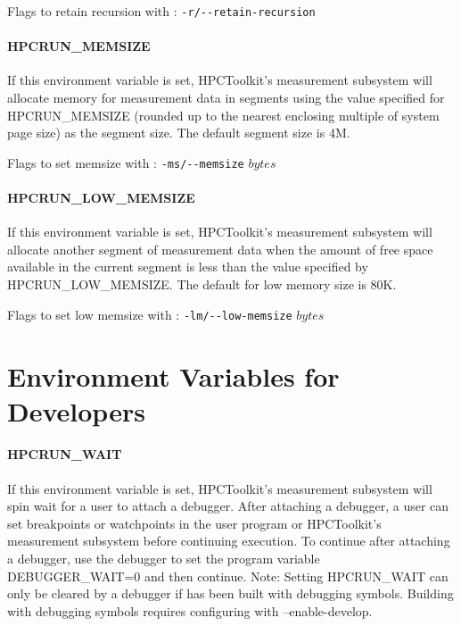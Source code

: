 \parg
Flags to retain recursion with \hpcrun: \verb|-r/--retain-recursion|

\paragraph{HPCRUN\_MEMSIZE}

If this environment variable is set, HPCToolkit's measurement subsystem
will allocate memory for measurement data in segments using the
value specified for HPCRUN\_MEMSIZE (rounded up to the nearest
enclosing multiple of system page size) as the segment size. The
default segment size is 4M.

\parg
Flags to set memsize with \hpcrun: \verb|-ms/--memsize| $bytes$

\paragraph{HPCRUN\_LOW\_MEMSIZE}

If this environment variable is set, HPCToolkit's measurement subsystem
will allocate another segment of measurement data when the amount
of free space available in the current segment is less than the
value specified by HPCRUN\_LOW\_MEMSIZE. The default for low memory
size is 80K.

\parg
Flags to set low memsize with \hpcrun: \verb|-lm/--low-memsize| $bytes$


\section{Environment Variables for Developers}
\label{system-env}

\paragraph{HPCRUN\_WAIT}

If this environment variable is set, HPCToolkit's measurement subsystem
will spin wait for a user to attach a debugger. After attaching a
debugger, a user can set breakpoints or watchpoints in the user
program or HPCToolkit's measurement subsystem before continuing
execution. To continue after attaching a debugger, use the debugger
to set the program variable DEBUGGER\_WAIT=0 and then continue.
Note: Setting HPCRUN\_WAIT can only be cleared by a debugger
if \HPCToolkit{} has been built with debugging symbols.
Building \HPCToolkit{} with debugging symbols requires
configuring \HPCToolkit{} with --enable-develop.

